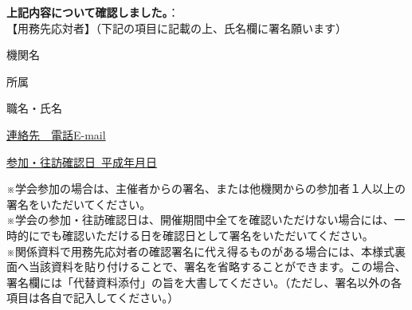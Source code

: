 \documentclass[a4paper,11pt]{memoir}
\begin{document}
\vspace{2em}
\raggedright
\hspace{20mm} {\bfseries 上記内容について確認しました。}：\\

\vspace{3em}
\hspace{20mm}【用務先応対者】（下記の項目に記載の上、氏名欄に署名願います）\\

\vspace{1em}
\hspace{45mm} 
\parbox[t][22em][t]{44em}{
機関名\\

\vspace{.5em}
\hrulefill

所属\\

\vspace{.5em}
\hrulefill

職名・氏名\\

\vspace{.5em}
\hrulefill

\vspace{2.0em}
\uline{連絡先~~電話\hfill E-mail \hfill}

\vspace{2.0em}
\underline{参加・往訪確認日~平成\hspace{5em}年\hspace{5em}月\hspace{5em}日}
}

\hrulefill

※学会参加の場合は、主催者からの署名、または他機関からの参加者１人以上の署名をいただいてください。\\
※学会の参加・往訪確認日は、開催期間中全てを確認いただけない場合には、一時的にでも確認いただける日を確認日として署名をいただいてください。\\
※関係資料で用務先応対者の確認署名に代え得るものがある場合には、本様式裏面へ当該資料を貼り付けることで、署名を省略することができます。この場合、署名欄には「代替資料添付」の旨を大書してください。（ただし、署名以外の各項目は各自で記入してください。）
\end{document}
